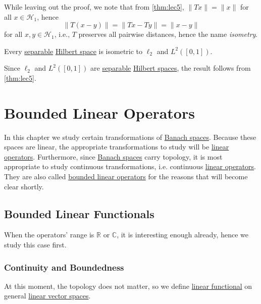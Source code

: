 While leaving out the proof, we note that from \autoref{thm:lec5}, \(\lVert Tx \rVert = \lVert x \rVert \) for all \(x\in \mathcal{H} _1\), hence
\[
	\lVert T(x-y) \rVert
	= \lVert Tx - Ty \rVert
	= \lVert x - y \rVert
\]
for all \(x, y\in \mathcal{H} _1\), i.e., \(T\) preserves all pairwise distances, hence the name \emph{isometry}.

\begin{remark}
	Every \hyperref[def:separable]{separable} \hyperref[def:Hilbert-space]{Hilbert space} is isometric to \(\ell _2\) and \(L^2([0, 1])\).
\end{remark}
\begin{explanation}
	Since \(\ell _2\) and \(L^2([0, 1])\) are \hyperref[def:separable]{separable} \hyperref[def:Hilbert-space]{Hilbert spaces}, the result follows from \autoref{thm:lec5}.
\end{explanation}

\chapter{Bounded Linear Operators}
In this chapter we study certain transformations of \hyperref[def:Banach-space]{Banach spaces}. Because these spaces are linear, the appropriate transformations to study will be \hyperref[def:linear-op]{linear operators}. Furthermore, since \hyperref[def:Banach-space]{Banach spaces} carry topology, it is most appropriate to study continuous transformations, i.e. continuous \hyperref[def:linear-op]{linear operators}. They are also called \hyperref[def:bounded-linear-op]{bounded linear operators} for the reasons that will become clear shortly.

\section{Bounded Linear Functionals}
When the operators' range is \(\mathbb{R} \) or \(\mathbb{C} \), it is interesting enough already, hence we study this case first.

\subsection{Continuity and Boundedness}
At this moment, the topology does not matter, so we define \hyperref[def:linear-functional]{linear functional} on general \hyperref[def:linear-vector-space]{linear vector spaces}.

